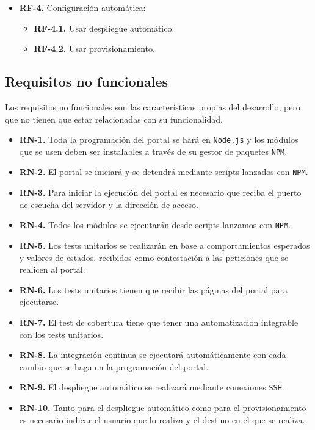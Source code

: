 \begin{itemize}
  \item \textbf{RF-4.} Configuración automática:
  \begin{itemize}
    \item \textbf{RF-4.1.} Usar despliegue automático.
    \item \textbf{RF-4.2.} Usar provisionamiento.
    \end{itemize}
\end{itemize}

\subsection{Requisitos no funcionales}

Los requisitos no funcionales son las características propias del desarrollo, pero que no tienen que estar relacionadas con su funcionalidad.

\begin{itemize}
  \item \textbf{RN-1.} Toda la programación del portal se hará en {\tt Node.js} y los módulos que se usen deben ser instalables a través de su gestor de paquetes {\tt NPM}.
  \item \textbf{RN-2.} El portal se iniciará y se detendrá mediante scripts lanzados con {\tt NPM}.
  \item \textbf{RN-3.} Para iniciar la ejecución del portal es necesario que reciba el puerto de escucha del servidor y la dirección de acceso.
  \item \textbf{RN-4.} Todos los módulos se ejecutarán desde scripts lanzamos con {\tt NPM}.
  \item \textbf{RN-5.} Los tests unitarios se realizarán en base a comportamientos esperados y valores de estados.
  recibidos como contestación a las peticiones que se realicen al portal.
  \item \textbf{RN-6.} Los tests unitarios tienen que recibir las páginas del portal para ejecutarse.
  \item \textbf{RN-7.} El test de cobertura tiene que tener una automatización integrable con los tests unitarios. 
  \item \textbf{RN-8.} La integración continua se ejecutará automáticamente con cada cambio que se haga en la programación del portal.
  \item \textbf{RN-9.} El despliegue automático se realizará mediante conexiones {\tt SSH}.
  \item \textbf{RN-10.} Tanto para el despliegue automático como para el provisionamiento es necesario indicar el usuario que lo realiza y el destino en el que se realiza.
\end{itemize}

